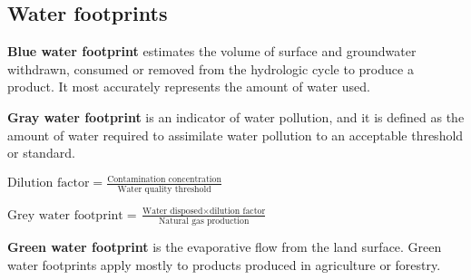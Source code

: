 
\subsection{Water footprints}

\textbf{Blue water footprint} estimates the volume of surface and groundwater
withdrawn, consumed or removed from the hydrologic cycle to produce a product.
It most accurately represents the amount of water used.

\textbf{Gray water footprint} is an indicator of water pollution, and it is
defined as the amount of water required to assimilate water pollution to an
acceptable threshold or standard.

$\text{Dilution factor} = \frac{\text{Contamination concentration}}
{\text{Water quality threshold}}$

$\text{Grey water footprint} = \frac{\text{Water disposed} \times
\text{dilution factor}}{\text{Natural gas production}}$

\textbf{Green water footprint} is the evaporative flow from the land surface.
Green water footprints apply mostly to products produced in agriculture or
forestry.